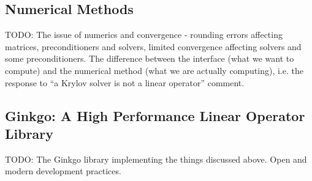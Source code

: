 \subsection{Numerical Methods}
TODO: The issue of numerics and convergence - rounding errors affecting
matrices, preconditioners and solvers, limited convergence affecting solvers and
some preconditioners. The difference between the interface (what we want to
compute) and the numerical method (what we are actually computing), i.e. the
response to ``a Krylov solver is not a linear operator'' comment.

\subsection{Ginkgo: A High Performance Linear Operator Library}
TODO: The Ginkgo library implementing the things discussed above. Open and
modern development practices.

